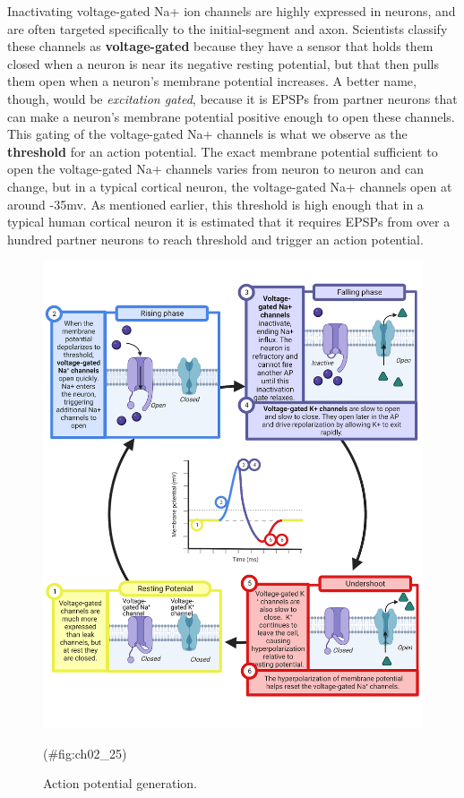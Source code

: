 \documentclass[
]{book}
\begin{document}
Inactivating voltage-gated Na+ ion channels are highly expressed in neurons, and are often targeted specifically to the initial-segment and axon. Scientists classify these channels as \textbf{voltage-gated} because they have a sensor that holds them closed when a neuron is near its negative resting potential, but that then pulls them open when a neuron's membrane potential increases. A better name, though, would be \emph{excitation gated}, because it is EPSPs from partner neurons that can make a neuron's membrane potential positive enough to open these channels. This gating of the voltage-gated Na+ channels is what we observe as the \textbf{threshold }for an action potential. The exact membrane potential sufficient to open the voltage-gated Na+ channels varies from neuron to neuron and can change, but in a typical cortical neuron, the voltage-gated Na+ channels open at around -35mv. As mentioned earlier, this threshold is high enough that in a typical human cortical neuron it is estimated that it requires EPSPs from over a hundred partner neurons to reach threshold and trigger an action potential.

\begin{figure}

{\centering \includegraphics[width=0.8\linewidth]{images/ch02/02_25} 

}

\caption{Action potential generation.}(\#fig:ch02_25)
\end{figure}
\end{document}
